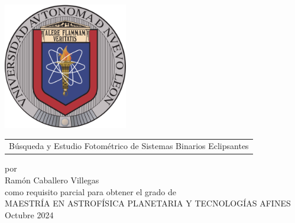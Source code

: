 \documentclass{sty/uanl}
\begin{document}
\def\titulo{Búsqueda y Estudio Fotométrico de Sistemas Binarios Eclipsantes}
\def\autor{Ramón Caballero Villegas}
\def\matricula{2125383}
\def\grado{Maestría en Astrofísica Planetaria y Tecnologías Afines}
\def\orientacion{}
\def\fecha{Octubre 2024}

\def\asesor{Dr. Andrés Alberto Avilés Alvarado}
\def\revisorA{Nombre del revisor A}
\def\revisorB{Nombre del revisor B}
\newif\ifdoctorado\doctoradofalse
\def\revisorC{Nombre del revisor C}
\def\revisorD{Nombre del revisor D}
\def\vobo{Dr. nombre del subdirector}


\thispagestyle{empty}

\begin{scshape}
\begin{center}
	{\Large \uanl} \\[5mm]
	{\large \fcfm} \\[5mm]
	{\large \pifi}
	\vskip15mm
	\includegraphics[height=55mm]{Figuras/uanl.png}
	\vskip12mm
	\begin{tabular}{p{11cm}}
		\centering
		{\large \titulo}
	\end{tabular}
	\vskip7mm
	{por}\\[7mm]
	{\large \autor}\\[7mm]
	{como requisito parcial para obtener el grado de}\\[3mm]
	\MakeUppercase{\grado}\\
	\orientacion
	\vfill
	\fecha
\end{center}
\end{scshape}
\end{document}
